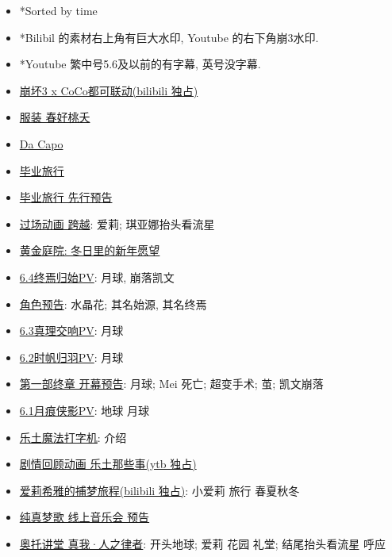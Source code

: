 \documentclass[a4paper]{article}
\begin{document}
\begin{itemize}
    \item *Sorted by time
    \item *Bilibil 的素材右上角有巨大水印, Youtube 的右下角崩3水印.
    \item *Youtube 繁中号5.6及以前的有字幕, 英号没字幕.
    \item \href{https://www.bilibili.com/video/BV1j84y1D7uf/}{崩坏3 x CoCo都可联动(bilibili 独占)}
    \item \href{https://www.bilibili.com/video/BV1tP411f7BY/}{服装 春好桃夭}
    \item \href{https://www.bilibili.com/video/BV1aM4y1R77W/}{Da Capo}
    \item \href{https://www.bilibili.com/video/BV1Kj411g7Lu/}{毕业旅行}
    \item \href{https://www.bilibili.com/video/BV1BD4y1g7Yp/}{毕业旅行 先行预告}
    \item \href{https://www.bilibili.com/video/BV1784y1p7vM/}{过场动画 跨越}: 爱莉; 琪亚娜抬头看流星
    \item \href{https://www.bilibili.com/video/BV1oA411o7zD/}{黄金庭院: 冬日里的新年愿望}
    \item \href{https://www.bilibili.com/video/BV12g411H7sC/}{6.4终焉归始PV}: 月球, 崩落凯文
    \item \href{https://www.bilibili.com/video/BV1jW4y1K7mE/}{角色预告}: 水晶花; 其名始源, 其名终焉
    \item \href{https://www.bilibili.com/video/BV12g411H7sC/}{6.3真理交响PV}: 月球
    \item \href{https://www.bilibili.com/video/BV1vY411f7qz/}{6.2时帆归羽PV}: 月球
    \item \href{https://www.bilibili.com/video/BV1eV4y1K7c7/}{第一部终章 开幕预告}: 月球; Mei 死亡; 超变手术; 茧; 凯文崩落
    \item \href{https://www.bilibili.com/video/BV1dd4y1B7Xb/}{6.1月痕侠影PV}: 地球 月球
    \item \href{https://www.bilibili.com/video/BV1f24y1d7tP/}{乐土魔法打字机}: 介绍
    \item \href{https://www.youtube.com/watch?v=p_aPQhXCVCM}{剧情回顾动画 乐土那些事(ytb 独占)}
    \item \href{https://www.bilibili.com/video/BV1ZW4y1t7Zf/}{爱莉希雅的捕梦旅程(bilibili 独占)}: 小爱莉 旅行 春夏秋冬
    \item \href{https://www.bilibili.com/bangumi/play/ep672059/}{纯真梦歌 线上音乐会 预告}
    \item \href{https://www.bilibili.com/video/BV1q14y147EC/}{奥托讲堂 真我·人之律者}: 开头地球; 爱莉 花园 礼堂; 结尾抬头看流星 呼应

\end{itemize}
\end{document}
